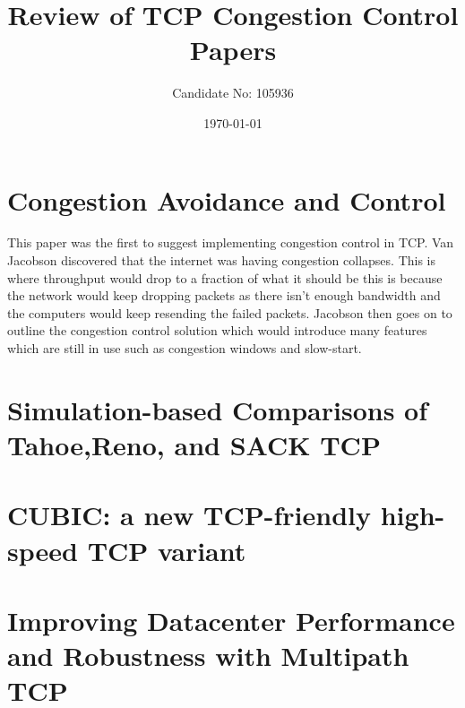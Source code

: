 \documentclass[a4paper,12pt]{scrartcl}
\title{Review of TCP Congestion Control Papers}
\author{Candidate No: 105936}
\date{\today}
\begin{document}
	
	\begin{titlepage}
		\maketitle
	\end{titlepage}
	
	\tableofcontents
	\newpage
	
	\section{Congestion Avoidance and Control\cite{JacobsonCongestAvoidanceControlArticle}}
	{
		This paper was the first to suggest implementing congestion control in TCP. Van Jacobson discovered that the internet was having congestion collapses. This is where throughput would drop to a fraction of what it should be this is because the network would keep dropping packets as there isn't enough bandwidth and the computers would keep resending the failed packets. Jacobson then goes on to outline the congestion control solution which would introduce many features which are still in use such as congestion windows and slow-start.
	}
	\section{Simulation-based Comparisons of Tahoe,Reno, and SACK TCP\cite{FallFloydTahoeRenoSack}}
	{
		
	}
	\section{CUBIC: a new TCP-friendly high-speed TCP variant\cite{HaRheeXuCubic}}
	{
		
	}
	\section{Improving Datacenter Performance and Robustness with Multipath TCP\cite{RaiciuBarrePluntkeGreenhalghWischikHandleyMultipathTCPArticle}}
	{
		
	}
	\newpage
	
	\printbibliography[heading=bibintoc,title=References]
\end{document}

